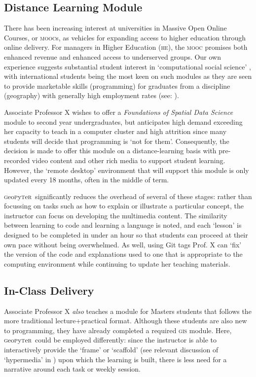 \documentclass[letter, 11pt,titlepage]{article}
\newcommand{\gp}{\textsc{g}eo\textsc{p}y\textsc{t}e\textsc{r}~\/}
\begin{document}
\subsection{Distance Learning Module}\label{an-online-module}

There has been increasing interest at universities in Massive Open Online Courses, or \textsc{mooc}s, as vehicles for expanding access to higher education through online delivery. For managers in Higher Education (\textsc{he}), the \textsc{mooc} promises both enhanced revenue and enhanced access to underserved groups. Our own experience suggests substantial student interest in `computational social science' \citep{Lazer2009}, with international students being the most keen on such modules as they are seen to provide marketable skills (programming) for graduates from a discipline (geography) with generally high employment rates (see: \citeauthor{rgs2017} \citeyear{rgs2017}).

Associate Professor X wishes to offer a \emph{Foundations of Spatial Data Science} module to second year undergraduates, but anticipates high demand exceeding her capacity to teach in  a computer cluster and high attrition since many students will decide that programming is `not for them'. Consequently, the decision is made to offer this module on a distance-learning basis with pre-recorded video content and other rich media to support student learning. However, the `remote desktop' environment that will support this module is only updated every 18 months, often in the middle of term.

\gp significantly reduces the overhead of several of these stages: rather than focussing on tasks such as how to explain or illustrate a particular concept, the instructor can focus on developing the multimedia content. The similarity between learning to code and learning a language is noted, and each `lesson' is designed to be completed in under an hour so that students can proceed at their own pace without being overwhelmed. As well, using Git tags Prof. X can `fix' the version of the code and explanations used to one that is appropriate to the computing environment while continuing to update her teaching materials.

\subsection{In-Class Delivery}\label{in-class-delivery}

Associate Professor X \emph{also} teaches a module for Masters students that follows the more traditional lecture+practical format. Although these students are also new to programming, they have already completed a required \textsc{gis} module. Here, \gp could be employed differently: since the instructor is able to interactively provide the `frame' or `scaffold' (see relevant discussion of `hypermedia' in \citealp{Azevedo2008}) upon which the learning is built, there is less need for a narrative around each task or weekly session. 
\end{document}
